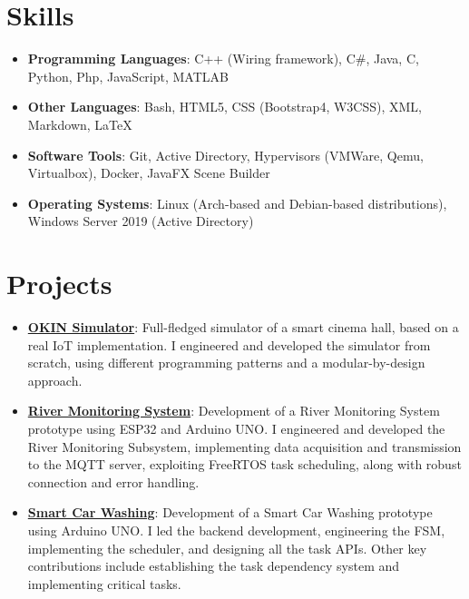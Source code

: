 \documentclass[letterpaper,11pt]{article}
\newcommand{\resumeItem}[2]{
  \item\small{
    \textbf{#1}{: #2 \vspace{-2pt}}
  }
}
\newcommand{\resumeSubItem}[2]{\resumeItem{#1}{#2}\vspace{-4pt}}
\newcommand{\resumeSubHeadingListStart}{\begin{itemize}[leftmargin=*]}
\newcommand{\resumeSubHeadingListEnd}{\end{itemize}}
\begin{document}
\begin{comment}
\section{Languages}
    \resumeSubHeadingListStart
    \resumeItem
      {Italian}{Native speaker}
    \resumeItem
      {English}{Level C1}
  \resumeSubHeadingListEnd
\end{comment}

\section{Skills}
 \resumeSubHeadingListStart
   \item{
     \textbf{Programming Languages}{: C++ (Wiring framework), C\#, Java, C, Python, Php, JavaScript, MATLAB}
     \hfill
     }
     \item{
     \textbf{Other Languages}{: Bash, HTML5, CSS (Bootstrap4, W3CSS), XML, Markdown, LaTeX}
     \hfill
     }
     \item{
     \textbf{Software Tools}{: Git, Active Directory, Hypervisors (VMWare, Qemu, Virtualbox), Docker, JavaFX Scene Builder}
     \hfill
     }
     \item{
     \textbf{Operating Systems}{: Linux (Arch-based and Debian-based distributions), Windows Server 2019 (Active Directory)}
     }
 \resumeSubHeadingListEnd

\section{Projects}
  \resumeSubHeadingListStart
  \resumeSubItem{\href{https://github.com/aleemont1/OKINsimulator}{OKIN Simulator}}
      {Full-fledged simulator of a smart cinema hall, based on a real IoT implementation.
       I engineered and developed the simulator from scratch, using different programming patterns and a modular-by-design approach.}
    \resumeSubItem{\href{https://github.com/aleemont1/esiot-23-24-assignment3/}{River Monitoring System}}
      {Development of a River Monitoring System prototype using ESP32 and Arduino UNO.
       I engineered and developed the River Monitoring Subsystem, implementing data acquisition and
       transmission to the MQTT server, exploiting FreeRTOS task scheduling, along with robust connection and error handling.}
    \resumeSubItem{\href{https://github.com/aleemont1/esiot-23-24-assignment2/}{Smart Car Washing}}
      {Development of a Smart Car Washing prototype using Arduino UNO. 
      I led the backend development, engineering the FSM, implementing the scheduler, and designing all the task APIs. 
      Other key contributions include establishing the task dependency system and implementing critical tasks.}
  \resumeSubHeadingListEnd
\end{document}
